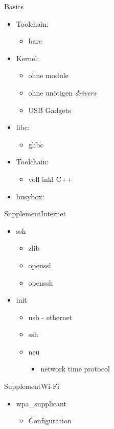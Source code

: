 \begin{frame}{Basics}
 \begin{itemize}
  \item Toolchain: 
  \begin{itemize}
   \item bare
  \end{itemize}
  \item Kernel:
  \begin{itemize}
   \item ohne module
   \item ohne unötigen {\em drivers}
   \item USB Gadgets
  \end{itemize}
  \item libc:
  \begin{itemize}
   \item glibc
  \end{itemize}
  \item Toolchain: 
  \begin{itemize}
   \item voll inkl C++
  \end{itemize}
  \item busybox:
 \end{itemize}
\end{frame}

\begin{frame}{Supplement}{Internet}
 \begin{itemize}
  \item ssh
  \begin{itemize}
   \item zlib
   \item openssl
   \item openssh
  \end{itemize}
  \item init
  \begin{itemize}
   \item usb - ethernet
   \item ssh
   \item {\Large neu} 
   \begin{itemize}
    \item network time protocol
   \end{itemize}
  \end{itemize}
 \end{itemize}
\end{frame}

\begin{frame}{Supplement}{Wi-Fi}
 \begin{itemize}
  \item wpa\_supplicant
  \begin{itemize}
   \item Configuration
  \end{itemize}
 \end{itemize}
\end{frame}

